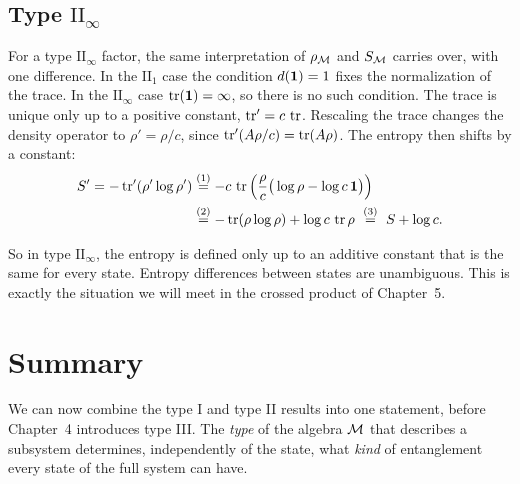 \subsection*{Type $\mathrm{II}_\infty$}

For a type $\mathrm{II}_\infty$ factor, the same interpretation of $\rho_{\mathcal{M}}$ and $S_{\mathcal{M}}$ carries over, with one
difference. In the $\mathrm{II}_1$ case the condition $d(\mathbf{1})=1$ fixes the normalization of the trace. In the
$\mathrm{II}_\infty$ case $\operatorname{tr}(\mathbf{1})=\infty$, so there is no such condition. The trace is unique only up to a
positive constant, $\operatorname{tr}'=c\,\operatorname{tr}$. Rescaling the trace changes the density operator to $\rho'=\rho/c$, since
$\operatorname{tr}'(A\rho/c)=\operatorname{tr}(A\rho)$. The entropy then shifts by a constant:
\begin{align}
S'=-\operatorname{tr}'(\rho'\log\rho')
&\overset{(1)}{=} -c\,\operatorname{tr}\Big(\frac{\rho}{c}\big(\log\rho-\log c\,\mathbf{1}\big)\Big) \notag\\
&\overset{(2)}{=} -\operatorname{tr}(\rho\log\rho)+\log c\,\operatorname{tr}\rho
\ \overset{(3)}{=}\ S+\log c . \notag
\end{align}
\quad
{}\quad
{}

So in type $\mathrm{II}_\infty$, the entropy is defined only up to an additive constant that is the same for
every state. Entropy differences between states are unambiguous. This is exactly the situation we will meet in
the crossed product of Chapter~5.

\section{Summary}

We can now combine the type I and type II results into one statement, before Chapter~4 introduces type III. The
\emph{type} of the algebra $\mathcal{M}$ that describes a subsystem determines, independently of the state, what
\emph{kind} of entanglement every state of the full system can have.

